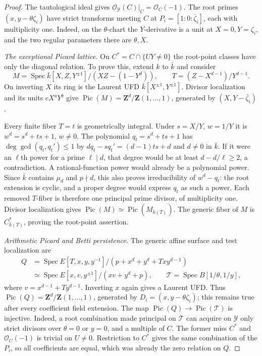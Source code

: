 \documentclass[11pt,a4paper]{amsart}
\numberwithin{equation}{section}
\theoremstyle{definition}
\theoremstyle{remark}
\newcommand{\Z}{\mathbf Z}
\newcommand{\Spec}{\operatorname{Spec}}
\newcommand{\Pic}{\operatorname{Pic}}
\begin{document}
\begin{proof}
The tautological ideal gives
$\mathcal O_{\mathcal Y}(C)|_C=\mathcal O_C(-1)$.
The root primes $(x,y-\theta\zeta_i)$ have strict transforms
meeting $C$ at $P_i=[1:0:\bar\zeta_i]$, each with multiplicity
one. Indeed, on the $\theta$-chart the $Y$-derivative is a unit
at $X=0,Y=\zeta_i$, and the two regular parameters there are
$\theta,X$.

\emph{The exceptional Picard lattice.}
On $C^*=C\cap\{UY\ne0\}$ the root-point classes have only
the diagonal relation. To prove this, extend $k$ to $\bar k$ and
consider
\[
 M=\Spec\bar k[X,Z,Y^{\pm1}]/(XZ-(1-Y^d)),\qquad
 T=(Z-X^{d-1})/Y^{d-1}.
\]
On inverting $X$ its ring is the Laurent UFD
$\bar k[X^{\pm1},Y^{\pm1}]$. Divisor localization and its units
$cX^aY^b$ give
$\Pic(M)=\Z^d/\Z(1,\ldots,1)$, generated by
$(X,Y-\bar\zeta_i)$.

Every finite fiber $T=t$ is geometrically integral. Under
$s=X/Y$, $w=1/Y$ it is
$w^d=s^d+ts+1$, $w\ne0$.
The polynomial $q_t=s^d+ts+1$ has $\deg\gcd(q_t,q_t')\le1$
by $dq_t-sq_t'=(d-1)ts+d$ and $d\ne0$ in $\bar k$.
If it were an $\ell$th power for a prime $\ell\mid d$,
that degree would be at least $d-d/\ell\ge2$, a contradiction.
A rational-function power would already be a polynomial power.
Since $\bar k$ contains $\mu_d$ and $p\nmid d$, this also
proves irreducibility of $w^d-q_t$: the root extension is
cyclic, and a proper degree would express $q_t$ as such a power.
Each removed $T$-fiber is therefore one principal prime divisor,
of multiplicity one. Divisor localization gives
$\Pic(M)\simeq\Pic(M_{\bar k(T)})$.
The generic fiber of $M$ is $C^*_{\bar k(T)}$, proving the root-point
assertion.

\emph{Arithmetic Picard and Betti persistence.}
The generic affine surface and test localization are
\begin{align*}
 Q&=\Spec E[T,x,y,y^{-1}]/(p+x^d+y^d+Txy^{d-1})\\
  &\simeq\Spec E[x,v,y^{\pm1}]/(xv+y^d+p),\qquad
 \mathcal T=\Spec B[1/\theta,1/y],
\end{align*}
where $v=x^{d-1}+Ty^{d-1}$. Inverting $x$ again gives a
Laurent UFD. Thus $\Pic(Q)=\Z^d/\Z(1,\ldots,1)$, generated
by $D_i=(x,y-\theta\zeta_i)$; this remains true after every
coefficient field extension.
The map $\Pic(Q)\to\Pic(\mathcal T)$ is injective.
Indeed, a root combination made principal on $\mathcal T$
can acquire on $\mathcal Y$ only strict divisors over $\theta=0$
or $y=0$, and a multiple of $C$. The former miss $C^*$ and
$\mathcal O_C(-1)$ is trivial on $U\ne0$.
Restriction to $C^*$ gives the same combination of the $P_i$,
so all coefficients are equal, which was already the zero
relation on $Q$.


\end{proof}
\end{document}
